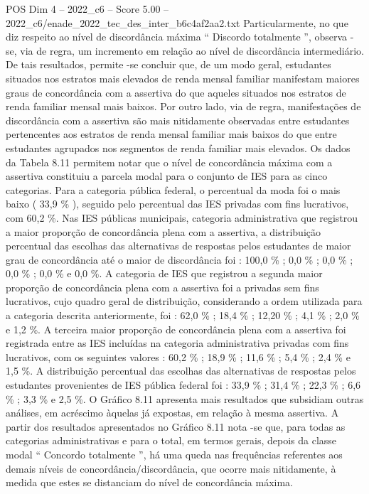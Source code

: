 \begin{textsample}{POS Dim 4 – 2022\_c6 – Score 5.00 – 2022\_c6/enade\_2022\_tec\_des\_inter\_b6c4af2aa2.txt}
Particularmente, no que diz respeito ao nível de discordância máxima “ Discordo totalmente ”, observa -se, via de regra, um incremento em relação ao nível de discordância intermediário.
De tais resultados, permite -se concluir que, de um modo geral, estudantes situados nos estratos mais elevados de renda mensal familiar manifestam maiores graus de concordância com a assertiva do que aqueles situados nos estratos de renda familiar mensal mais baixos.
Por outro lado, via de regra, manifestações de discordância com a assertiva são mais nitidamente observadas entre estudantes pertencentes aos estratos de renda mensal familiar mais baixos do que entre estudantes agrupados nos segmentos de renda familiar mais elevados.
Os dados da Tabela 8.11 permitem notar que o nível de concordância máxima com a assertiva constituiu a parcela modal para o conjunto de IES para as cinco categorias.
Para a categoria pública federal, o percentual da moda foi o mais baixo ( 33,9 \% ), seguido pelo percentual das IES privadas com fins lucrativos, com 60,2 \%.
Nas IES públicas municipais, categoria administrativa que registrou a maior proporção de concordância plena com a assertiva, a distribuição percentual das escolhas das alternativas de respostas pelos estudantes de maior grau de concordância até o maior de discordância foi : 100,0 \% ; 0,0 \% ; 0,0 \% ; 0,0 \% ; 0,0 \% e 0,0 \%.
A categoria de IES que registrou a segunda maior proporção de concordância plena com a assertiva foi a privadas sem fins lucrativos, cujo quadro geral de distribuição, considerando a ordem utilizada para a categoria descrita anteriormente, foi : 62,0 \% ; 18,4 \% ; 12,20 \% ; 4,1 \% ; 2,0 \% e 1,2 \%.
A terceira maior proporção de concordância plena com a assertiva foi registrada entre as IES incluídas na categoria administrativa privadas com fins lucrativos, com os seguintes valores : 60,2 \% ; 18,9 \% ; 11,6 \% ; 5,4 \% ; 2,4 \% e 1,5 \%.
A distribuição percentual das escolhas das alternativas de respostas pelos estudantes provenientes de IES pública federal foi : 33,9 \% ; 31,4 \% ; 22,3 \% ; 6,6 \% ; 3,3 \% e 2,5 \%.
O Gráfico 8.11 apresenta mais resultados que subsidiam outras análises, em acréscimo àquelas já expostas, em relação à mesma assertiva.
A partir dos resultados apresentados no Gráfico 8.11 nota -se que, para todas as categorias administrativas e para o total, em termos gerais, depois da classe modal “ Concordo totalmente ”, há uma queda nas frequências referentes aos demais níveis de concordância/discordância, que ocorre mais nitidamente, à medida que estes se distanciam do nível de concordância máxima.

\end{textsample}
